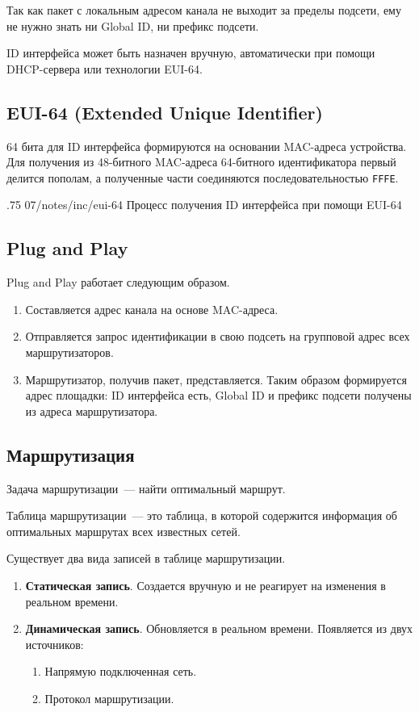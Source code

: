Так как пакет с локальным адресом канала не выходит за пределы подсети, ему не нужно знать ни Global ID, ни префикс подсети.

ID интерфейса может быть назначен вручную, автоматически при помощи
DHCP-сервера или технологии EUI-64.

\subsection{EUI-64 (Extended Unique Identifier)}

64 бита для ID интерфейса формируются на основании MAC-адреса устройства. Для получения из 48-битного MAC-адреса 64-битного идентификатора первый делится пополам, а полученные части соединяются последовательностью \texttt{FFFE}.

\image
{.75\textwidth}
{07/notes/inc/eui-64}
{Процесс получения ID интерфейса при помощи EUI-64}

\subsection{Plug and Play}

Plug and Play работает следующим образом.

\begin{enumerate}
    \item Составляется адрес канала на основе MAC-адреса.
    \item Отправляется запрос идентификации в свою подсеть на групповой адрес всех маршрутизаторов.
    \item Маршрутизатор, получив пакет, представляется. Таким образом формируется адрес площадки: ID интерфейса есть, Global ID и префикс подсети получены из адреса маршрутизатора.
\end{enumerate}

\subsection{Маршрутизация}

Задача маршрутизации~--- найти оптимальный маршрут.

\begin{dd}
    Таблица маршрутизации~--- это таблица, в которой содержится информация об оптимальных маршрутах всех известных сетей.
\end{dd}

Существует два вида записей в таблице маршрутизации.

\begin{enumerate}
    \item \textbf{Статическая запись}. Создается вручную и не реагирует на изменения в реальном времени.
    \item \textbf{Динамическая запись}. Обновляется в реальном времени. Появляется из двух источников:
          \begin{enumerate}
              \item Напрямую подключенная сеть.
              \item Протокол маршрутизации.
          \end{enumerate}
\end{enumerate}

